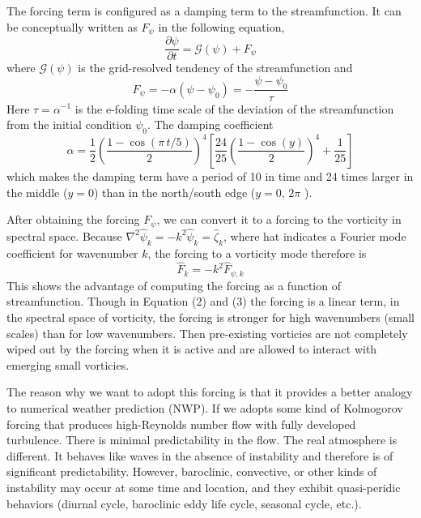 \documentclass[a4paper,11pt]{article}
\begin{document}
The forcing term is configured as a damping term to the streamfunction. It can be conceptually written as $F_{\psi}$ in the following equation,
\begin{equation}
 \frac{\partial \psi}{\partial t} = \mathcal{G}(\psi) + F_{\psi}
\end{equation}
where $\mathcal{G}(\psi)$ is the grid-resolved tendency of the streamfunction and 
\begin{equation}
 F_{\psi} = -\alpha (\psi - \psi_0) = -\frac{\psi - \psi_0}{\tau}
\end{equation}
Here $\tau = \alpha^{-1}$ is the e-folding time scale of the deviation of the streamfunction from the initial condition $\psi_0$. The damping coefficient
\begin{equation}
 \alpha = \frac12 \left(\frac{1 - \cos(\pi\,t/5)}{2}\right)^4 \left[\frac{24}{25}\left(\frac{1 - \cos(y)}{2} \right)^4 +\frac{1}{25}\right] 
\end{equation}
which makes the damping term have a period of 10 in time and 24 times larger in the middle ($y=0$) than in the north/south edge ($y=0,\,2\pi$ ).

After obtaining the forcing $F_{\psi}$, we can convert it to a forcing to the vorticity in spectral space. Because $\nabla^2 \hat{\psi}_k = -k^2\hat{\psi}_k = \hat{\zeta}_k$, where hat indicates a Fourier mode coefficient for wavenumber $k$, the forcing to a vorticity mode therefore is 
\begin{equation}
 \hat{F}_k = -k^2 \hat{F}_{\psi,k}
\end{equation}
This shows the advantage of computing the forcing as a function of streamfunction. Though in Equation (2) and (3) the forcing is a linear term, in the spectral space of vorticity, the forcing is stronger for high wavenumbers (small scales) than for low wavenumbers. Then pre-existing vorticies are not completely wiped out by the forcing when it is active and are allowed to interact with  emerging small vorticies. 

The reason why we want to adopt this forcing is that it provides a better analogy to numerical weather prediction (NWP). If we adopts some kind of Kolmogorov forcing that produces high-Reynolds number flow with fully developed turbulence. There is minimal predictability in the flow. The real atmosphere is different. It behaves like waves in the absence of instability and therefore is of significant predictability. However, baroclinic, convective, or other kinds of instability may occur at some time and location, and they exhibit quasi-peridic behaviors (diurnal cycle, baroclinic eddy life cycle, seasonal cycle, etc.).
\end{document}

